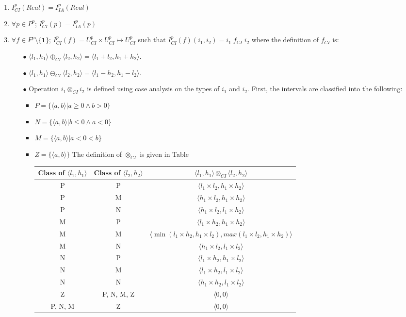 \begin{enumerate}
\item $I^p_{CI}(Real) = I^p_{IA}(Real)$
\item $\forall p \in P^p$; $I^p_{CI}(p)= I^p_{IA}(p)$
\item $\forall f \in F^p \setminus \{\mathbf{1}\}$; $I^p_{CI}(f) = U^p_{CI} \times U^p_{CI} \mapsto U^p_{CI}$ such that $ I^p_{CI}(f)(i_1, i_2)= i_1 \; f_{CI} \; i_2$ where the definition of $f_{CI}$ is:
\begin{itemize}
\item[$\bullet$] $\langle l_1, h_1 \rangle \oplus_{CI} \langle l_2, h_2 \rangle = \langle l_1 + l_2, h_1 + h_2 \rangle $.
\item[$\bullet$] $\langle l_1, h_1 \rangle \ominus_{CI} \langle l_2, h_2 \rangle = \langle l_1 - h_2, h_1 - l_2 \rangle $.
\item[$\bullet$] Operation $i_1 \otimes_{CI} i_2$ is defined using case analysis on the types of $i_1$ and $i_2$. First, the intervals are classified into the following:
\begin{itemize}
\item $P = \{\langle a, b \rangle | a \ge 0 \wedge b > 0 \}$
\item $N = \{\langle a, b \rangle | b \le 0 \wedge a < 0 \}$
\item $M = \{\langle a, b \rangle | a < 0 < b \}$
\item $Z = \{\langle a, b \rangle\}$
The definition of $\otimes_{CI}$ is given in Table ~
\begin{center}
\begin{tabular}{ | c | c | c |}
\hline
Class of $\langle l_1, h_1 \rangle$ & Class of $\langle l_2, h_2 \rangle$ & $\langle l_1, h_1 \rangle \otimes_{CI} \langle l_2, h_2 \rangle$ \\ \hline
P & P & $\langle l_1 \times l_2, h_1 \times h_2 \rangle $ \\ \hline
P & M & $\langle h_1 \times l_2, h_1 \times h_2 \rangle $ \\ \hline
P & N & $\langle h_1 \times l_2, l_1 \times h_2 \rangle $ \\ \hline
M & P & $\langle l_1 \times h_2, h_1 \times h_2 \rangle $ \\ \hline
M & M & $\langle \min (l_1 \times h_2, h_1 \times l_2), max (l_1 \times l_2, h_1 \times h_2) \rangle $ \\ \hline
M & N & $\langle h_1 \times l_2, l_1 \times l_2 \rangle $ \\ \hline
N & P & $\langle l_1 \times h_2, h_1 \times l_2 \rangle $ \\ \hline
N & M & $\langle l_1 \times h_2, l_1 \times l_2 \rangle $ \\ \hline
N & N & $\langle h_1 \times h_2, l_1 \times l_2 \rangle $ \\ \hline
Z & P, N, M, Z & $\langle 0, 0 \rangle $ \\ \hline
P, N, M & Z & $\langle 0, 0 \rangle $ \\ \hline
\end{tabular}
\end{center}
\end{itemize}


\end{itemize}
\end{enumerate}
